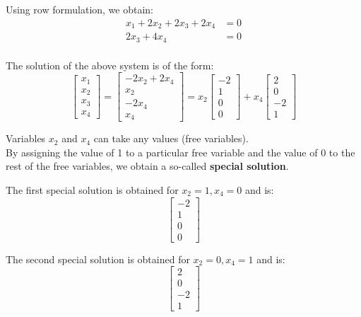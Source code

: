 Using row formulation, we obtain:
\begin{align*}
x_1 + 2x_2 + 2x_3 + 2x_4 &= 0 \\
2x_3 + 4x_4 &= 0 \\
\end{align*}

The solution of the above system is of the form:
\[
\begin{bmatrix}
x_1 \\
x_2 \\
x_3 \\
x_4
\end{bmatrix} = 
\begin{bmatrix}
-2x_2 + 2x_4 \\
x_2 \\
-2x_4 \\
x_4
\end{bmatrix} = x_2
\begin{bmatrix}
-2 \\
1 \\
0 \\
0
\end{bmatrix} + x_4
\begin{bmatrix}
2 \\
0 \\
-2 \\
1
\end{bmatrix}
\]

Variables \( x_2 \) and \( x_4 \) can take any values (free variables).\\

By assigning the value of 1 to a particular free variable and the value of 0 to the rest of the free variables, we obtain a so-called \textbf{special solution}.

The first special solution is obtained for \( x_2 = 1, x_4 = 0 \) and is:
\[
\begin{bmatrix}
-2 \\
1 \\
0 \\
0
\end{bmatrix}
\]

The second special solution is obtained for \( x_2 = 0, x_4 = 1 \) and is:
\[
\begin{bmatrix}
2 \\
0 \\
-2 \\
1
\end{bmatrix}
\]

